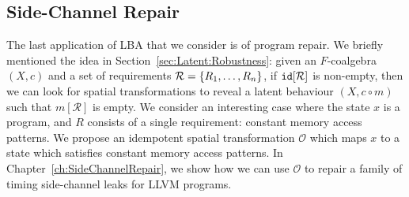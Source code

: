 \subsection{Side-Channel Repair}
The last application of LBA that we consider is of program repair. We briefly mentioned the idea in Section~\ref{sec:Latent:Robustness}: given an $F$-coalgebra $(X,c)$ and a set of requirements $\mathcal{R}=\left\{R_1, \ldots, R_n\right\}$, if ${\texttt{id}}[\mathcal{R}]$ is non-empty, then we can look for spatial transformations to reveal a latent behaviour $(X,c\circ m)$ such that $m[\mathcal{R}]$ is empty. We consider an interesting case where the state $x$ is a program, and $R$ consists of a single requirement: constant memory access patterns. We propose an idempotent spatial transformation $\mathcal{O}$ which maps $x$ to a state which satisfies constant memory access patterns. In Chapter~\ref{ch:SideChannelRepair}, we show how we can use $\mathcal{O}$ to repair a family of timing side-channel leaks for LLVM programs.





